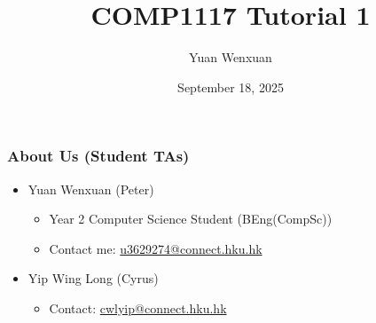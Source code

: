\documentclass{beamer}
\title{COMP1117 Tutorial 1}
\author{Yuan Wenxuan}
\date{September 18, 2025}
\begin{document}
\frame{\titlepage}

\begin{frame}
    \frametitle{About Us (Student TAs)}

    \begin{itemize}
        \item Yuan Wenxuan (Peter)
              \begin{itemize}
                  \item Year 2 Computer Science Student (BEng(CompSc))
                  \item Contact me: \href{mailto:u3629274@connect.hku.hk}{u3629274@connect.hku.hk}
              \end{itemize}
        \item Yip Wing Long (Cyrus)
              \begin{itemize}
                  \item Contact: \href{mailto:cwlyip@connect.hku.hk}{cwlyip@connect.hku.hk}
              \end{itemize}
    \end{itemize}
\end{frame}
\end{document}
